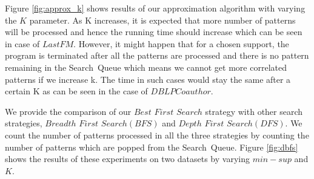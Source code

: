 \par Figure \ref{fig:approx_k} shows results of our approximation algorithm with varying the $K$ parameter. As K increases, it is expected that more number of patterns will be processed and hence the running time should increase which can be seen in case of $LastFM$. However, it might happen that for a chosen support, the program is terminated after all the patterns are processed and there is no pattern remaining in the {\sf Search\ Queue} which means we cannot get more correlated patterns if we increase k. The time in such cases would stay the same after a certain K as can be seen in the case of $DBLP Coauthor$.



 We provide the comparison of our $Best$ $First$ $Search$ strategy with other search strategies, $Breadth$ $First$ $Search(BFS)$ and $Depth$ $First$ $Search(DFS)$. We count the number of patterns processed in all the three strategies by counting the number of patterns which are popped from the {\sf Search\ Queue}. Figure \ref{fig:dbfs} shows the results of these experiments on two datasets by varying $min-sup$ and $K$. 

